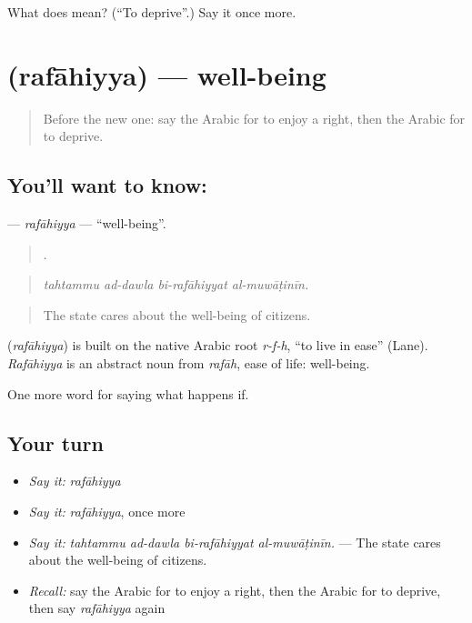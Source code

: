 \begin{tcolorbox}[breakable,colback=teal!4,colframe=teal!35!black,title={Before you move on}]
What does  mean? (\textquotedblleft{}To deprive\textquotedblright{}.) Say it once more.
\end{tcolorbox}
\section[\texorpdfstring{\ar{رفاهية} (rafāhiyya)}{رفاهية (rafāhiyya)}]{ (rafāhiyya) — well-being}

\label{lesson:AR-C408-rafahiyya}



\begin{quote}
Before the new one: say the Arabic for to enjoy a right, then the Arabic for to deprive.
\end{quote}

\subsection*{You'll want to know: }
\textbf{} — \emph{rafāhiyya} — \textquotedblleft{}well-being\textquotedblright{}.

\begin{quote}
   .
\end{quote}

\begin{quote}
\emph{tahtammu ad-dawla bi-rafāhiyyat al-muwāṭinīn.}
\end{quote}

\begin{quote}
The state cares about the well-being of citizens.
\end{quote}

\begin{cousinweb}
\textbf{} (\emph{rafāhiyya}) is built on the native Arabic root \emph{r-f-h}, \textquotedblleft{}to live in ease\textquotedblright{} (Lane). \emph{Rafāhiyya} is an abstract noun from \emph{rafāh}, ease of life: well-being.
\end{cousinweb}

\begin{grammarlens}[title={What you've built}]
One more word for saying what happens if.
\end{grammarlens}

\subsection*{Your turn}
\begin{itemize}
\raggedright
  \item \emph{Say it:} \emph{rafāhiyya}
  \item \emph{Say it:} \emph{rafāhiyya}, once more
  \item \emph{Say it:} \emph{tahtammu ad-dawla bi-rafāhiyyat al-muwāṭinīn.} — The state cares about the well-being of citizens.
  \item \emph{Recall:} say the Arabic for to enjoy a right, then the Arabic for to deprive, then say \emph{rafāhiyya} again
\end{itemize}

